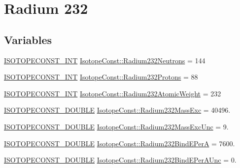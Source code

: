 \hypertarget{group___isotope_const-_radium-_ra232}{}\section{Radium 232}
\label{group___isotope_const-_radium-_ra232}
\subsection*{Variables}
\begin{DoxyCompactItemize}
\item 
\mbox{\hyperlink{group___isotope_const-_macros_ga5f18360b3e99483a35c32d789e62621c}{I\+S\+O\+T\+O\+P\+E\+C\+O\+N\+S\+T\+\_\+\+I\+NT}} \mbox{\hyperlink{group___isotope_const-_radium-_ra232_gafb65dcdff3ba8b4a0ef8f1a4a825fb62}{Isotope\+Const\+::\+Radium232\+Neutrons}} = 144
\item 
\mbox{\hyperlink{group___isotope_const-_macros_ga5f18360b3e99483a35c32d789e62621c}{I\+S\+O\+T\+O\+P\+E\+C\+O\+N\+S\+T\+\_\+\+I\+NT}} \mbox{\hyperlink{group___isotope_const-_radium-_ra232_gacbed461304c988913203a53968f1e256}{Isotope\+Const\+::\+Radium232\+Protons}} = 88
\item 
\mbox{\hyperlink{group___isotope_const-_macros_ga5f18360b3e99483a35c32d789e62621c}{I\+S\+O\+T\+O\+P\+E\+C\+O\+N\+S\+T\+\_\+\+I\+NT}} \mbox{\hyperlink{group___isotope_const-_radium-_ra232_gaeffd8f9a07a1bf6c618002d2f75a4439}{Isotope\+Const\+::\+Radium232\+Atomic\+Weight}} = 232
\item 
\mbox{\hyperlink{group___isotope_const-_macros_ga8f45a7272ce02c0b4c65c44636ed719a}{I\+S\+O\+T\+O\+P\+E\+C\+O\+N\+S\+T\+\_\+\+D\+O\+U\+B\+LE}} \mbox{\hyperlink{group___isotope_const-_radium-_ra232_gadc2594c8dc27b014c9bf7f0f55259ace}{Isotope\+Const\+::\+Radium232\+Mass\+Exc}} = 40496.
\item 
\mbox{\hyperlink{group___isotope_const-_macros_ga8f45a7272ce02c0b4c65c44636ed719a}{I\+S\+O\+T\+O\+P\+E\+C\+O\+N\+S\+T\+\_\+\+D\+O\+U\+B\+LE}} \mbox{\hyperlink{group___isotope_const-_radium-_ra232_gafbd385af71331b38bec679e1967183c6}{Isotope\+Const\+::\+Radium232\+Mass\+Exc\+Unc}} = 9.
\item 
\mbox{\hyperlink{group___isotope_const-_macros_ga8f45a7272ce02c0b4c65c44636ed719a}{I\+S\+O\+T\+O\+P\+E\+C\+O\+N\+S\+T\+\_\+\+D\+O\+U\+B\+LE}} \mbox{\hyperlink{group___isotope_const-_radium-_ra232_ga4d51fd1e640858da815de3cf02c364c0}{Isotope\+Const\+::\+Radium232\+Bind\+E\+PerA}} = 7600.
\item 
\mbox{\hyperlink{group___isotope_const-_macros_ga8f45a7272ce02c0b4c65c44636ed719a}{I\+S\+O\+T\+O\+P\+E\+C\+O\+N\+S\+T\+\_\+\+D\+O\+U\+B\+LE}} \mbox{\hyperlink{group___isotope_const-_radium-_ra232_gad4dc6be01a39c224acbf0ebbe66c7246}{Isotope\+Const\+::\+Radium232\+Bind\+E\+Per\+A\+Unc}} = 0.

\end{DoxyCompactItemize}
